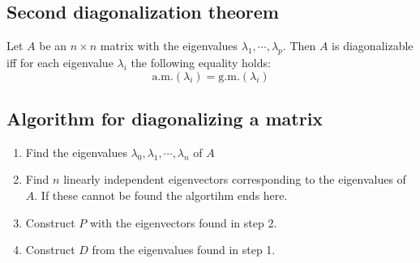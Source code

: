 \documentclass[11pt, a4paper]{article}
\newcommand*{\am}{\ensuremath{\text{a.m.}}}
\newcommand*{\gm}{\ensuremath{\text{g.m.}}}
\begin{document}
\subsection{Second diagonalization theorem}
Let $A$ be an $n \times n$ matrix with the eigenvalues $\lambda_1, \cdots, \lambda_p$. Then $A$ is diagonalizable iff for each eigenvalue $\lambda_i$ the following equality holds:
\begin{equation}
  \am(\lambda_i) = \gm(\lambda_i)
\end{equation}


\subsection{Algorithm for diagonalizing a matrix}
\begin{enumerate}
  \item Find the eigenvalues $\lambda_0, \lambda_1, \cdots, \lambda_n$ of $A$
  \item Find $n$ linearly independent eigenvectors corresponding to the eigenvalues of $A$. If these cannot be found the algortihm ends here.
  \item Construct $P$ with the eigenvectors found in step 2.
  \item Construct $D$ from the eigenvalues found in step 1.
\end{enumerate}
\end{document}
